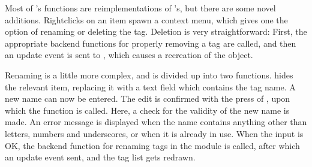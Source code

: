 Most of 's functions are reimplementations of 's, but there are some novel additions. Rightclicks on an item spawn a context menu, which gives one the option of renaming or deleting the tag. Deletion is very straightforward: First, the appropriate backend functions for properly removing a tag are called, and then an update event is sent to , which causes a recreation of the  object.

Renaming is a little more complex, and is divided up into two functions.  hides the relevant item, replacing it with a text field which contains the tag name. A new name can now be entered. The edit is confirmed with the press of , upon which the function  is called. Here, a check for the validity of the new name is made. An error message is displayed when the name contains anything other than letters, numbers and underscores, or when it is already in use. When the input is OK, the backend function for renaming tags in the  module is called, after which an update event sent, and the tag list gets redrawn.